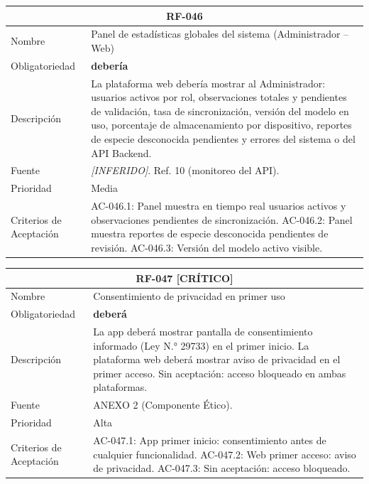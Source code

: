 \documentclass[12pt, a4paper]{article}
\newcommand{\criticomark}{\textcolor{criticolor}{\textbf{[CR\'ITICO]}}}
\newcommand{\inferido}{\textcolor{medio}{\textit{[INFERIDO]}}}
\begin{document}
\begin{longtable}{|p{3cm}|p{11.5cm}|}
\hline
\multicolumn{2}{|c|}{\textbf{RF-046}} \\
\hline
Nombre & Panel de estad\'isticas globales del sistema (Administrador -- Web) \\
\hline
Obligatoriedad & \textbf{deber\'ia} \\
\hline
Descripci\'on & La plataforma web deber\'ia mostrar al Administrador: usuarios activos por rol, observaciones totales y pendientes de validaci\'on, tasa de sincronizaci\'on, versi\'on del modelo en uso, porcentaje de almacenamiento por dispositivo, reportes de especie desconocida pendientes y errores del sistema o del API Backend. \\
\hline
Fuente & \inferido{}. Ref. 10 (monitoreo del API). \\
\hline
Prioridad & Media \\
\hline
Criterios de Aceptaci\'on &
AC-046.1: Panel muestra en tiempo real usuarios activos y observaciones pendientes de sincronizaci\'on. \newline
AC-046.2: Panel muestra reportes de especie desconocida pendientes de revisi\'on. \newline
AC-046.3: Versi\'on del modelo activo visible. \\
\hline
\end{longtable}

\begin{longtable}{|p{3cm}|p{11.5cm}|}
\hline
\multicolumn{2}{|c|}{\textbf{RF-047} \criticomark} \\
\hline
Nombre & Consentimiento de privacidad en primer uso \\
\hline
Obligatoriedad & \textbf{deber\'a} \\
\hline
Descripci\'on & La app deber\'a mostrar pantalla de consentimiento informado (Ley N.° 29733) en el primer inicio. La plataforma web deber\'a mostrar aviso de privacidad en el primer acceso. Sin aceptaci\'on: acceso bloqueado en ambas plataformas. \\
\hline
Fuente & ANEXO 2 (Componente \'Etico). \\
\hline
Prioridad & Alta \\
\hline
Criterios de Aceptaci\'on &
AC-047.1: App primer inicio: consentimiento antes de cualquier funcionalidad. \newline
AC-047.2: Web primer acceso: aviso de privacidad. \newline
AC-047.3: Sin aceptaci\'on: acceso bloqueado. \\
\hline
\end{longtable}
\end{document}
